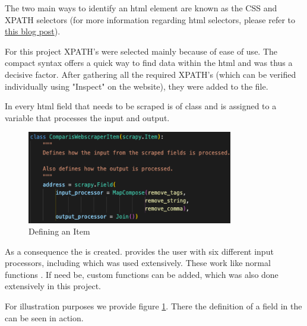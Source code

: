 \documentclass[main]{subfiles}
\begin{document}
The two main ways to identify an \acs*{html} element are known as the CSS and XPATH selectors 
(for more information regarding \acs*{html} selectors, please refer to 
\href{https://medium.com/geekculture/how-to-parse-a-webpage-using-selectors-scraping-with-dfb3894cff58}{this blog post}).

For this project XPATH's were selected mainly because of ease of use.
The compact syntax offers a quick way to find data within the \acs*{html} and was thus a decisive factor.
After gathering all the required XPATH's (which can be verified individually using "Inspect" on the website), 
they were added to the \pkg[items.py] file.

In \pkg[items.py] every \acs*{html} field that needs to be scraped is of class  
and is assigned to a variable that processes the input and output.


\begin{figure}[htbp]
    \centerline{
        \includegraphics[width = 90mm]{prog_5.png}}
    \caption{Defining an Item}
    \label{fig:itemloader}
\end{figure}



As a consequence the \pkg[ItemLoader] is created.
\pkg[Scrapy] provides the user with six different input processors,
including  \pkg[MapCompose()] which was used extensively.
These work like normal functions \cite{sDemystifyingScrapyItem2020}.
If need be, custom functions can be added, which was also done extensively in this project.

For illustration purposes we provide figure \ref{fig:itemloader}. 
There the definition of a field in the \pkg[ItemLoader] can be seen in action.
\end{document}
